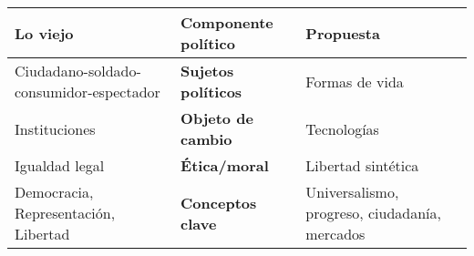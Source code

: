 \documentclass[
]{article}
\begin{document}
\begin{longtable}[]{@{}lll@{}}
\toprule
\begin{minipage}[b]{0.33\columnwidth}\raggedright
\textbf{Lo viejo}\strut
\end{minipage} & \begin{minipage}[b]{0.20\columnwidth}\raggedright
\textbf{Componente político}\strut
\end{minipage} & \begin{minipage}[b]{0.38\columnwidth}\raggedright
\textbf{Propuesta}\strut
\end{minipage}\tabularnewline
\midrule
\endhead
\begin{minipage}[t]{0.33\columnwidth}\raggedright
Ciudadano-soldado-consumidor-espectador\strut
\end{minipage} & \begin{minipage}[t]{0.20\columnwidth}\raggedright
\textbf{Sujetos políticos}\strut
\end{minipage} & \begin{minipage}[t]{0.38\columnwidth}\raggedright
Formas de vida\strut
\end{minipage}\tabularnewline
\begin{minipage}[t]{0.33\columnwidth}\raggedright
Instituciones\strut
\end{minipage} & \begin{minipage}[t]{0.20\columnwidth}\raggedright
\textbf{Objeto de cambio}\strut
\end{minipage} & \begin{minipage}[t]{0.38\columnwidth}\raggedright
Tecnologías\strut
\end{minipage}\tabularnewline
\begin{minipage}[t]{0.33\columnwidth}\raggedright
Igualdad legal\strut
\end{minipage} & \begin{minipage}[t]{0.20\columnwidth}\raggedright
\textbf{Ética/moral}\strut
\end{minipage} & \begin{minipage}[t]{0.38\columnwidth}\raggedright
Libertad sintética\strut
\end{minipage}\tabularnewline
\begin{minipage}[t]{0.33\columnwidth}\raggedright
Democracia, Representación, Libertad\strut
\end{minipage} & \begin{minipage}[t]{0.20\columnwidth}\raggedright
\textbf{Conceptos clave}\strut
\end{minipage} & \begin{minipage}[t]{0.38\columnwidth}\raggedright
Universalismo, progreso, ciudadanía, mercados\strut
\end{minipage}\tabularnewline
\bottomrule
\end{longtable}
\end{document}
